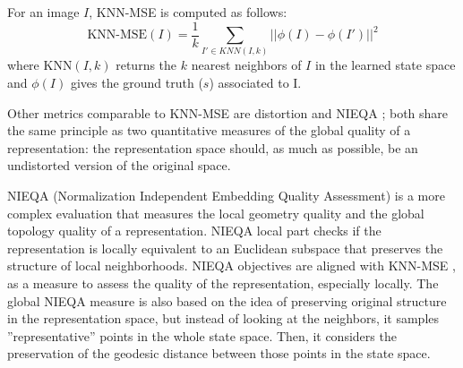 \documentclass[a4paper]{article}
\begin{document}
For an image $I$, KNN-MSE is computed as follows: 
\begin{equation}\label{eq:knn_mse_crit}
\textrm{KNN-MSE}(I)=\frac{1}{k}\sum_{I' \in KNN(I,k) } || \phi(I) - \phi(I') ||^2
\end{equation}
where $\textrm{KNN}(I,k)$ returns the $k$ nearest neighbors of $I$ in the learned state space and $\phi(I)$ gives the ground truth ($s$) associated to I. 

Other metrics comparable to KNN-MSE are distortion \cite{Indyk01} and NIEQA \cite{Zhang11}; both share the same principle as two quantitative measures of the global quality of a representation: the representation space should, as much as possible, be an undistorted version of the original space.%

NIEQA (Normalization Independent Embedding Quality Assessment) \cite{Zhang12} is a more complex evaluation that measures the local geometry quality and the global topology quality of a representation. NIEQA local part checks if the representation is locally equivalent to an Euclidean subspace that preserves the structure of local neighborhoods. NIEQA objectives are aligned with KNN-MSE \cite{Lesort17}, as a measure to assess the quality of the representation, especially locally. The global NIEQA measure is also based on the idea of preserving original structure in the representation space, but instead of looking at the neighbors, it samples ”representative” points in the whole state space. Then, it considers the preservation of the geodesic distance between those points in the state space.
\end{document}
